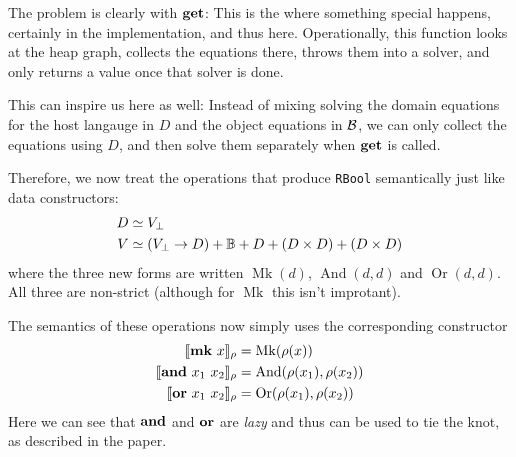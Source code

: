 \documentclass[manuscript,screen,acmsmall,nonacm]{acmart}
\begin{document}
The problem is clearly with $\mathbf{get}$: This is the where something special happens, certainly in the implementation, and thus here. Operationally, this function looks at the heap graph, collects the equations there, throws them into a solver, and only returns a value once that solver is done.

This can inspire us here as well: Instead of mixing solving the domain equations for the host langauge in $D$  and the object equations in $\mathcal B$, we can only collect the equations using $D$, and then solve them separately when $\mathbf{get}$ is called.

\newcommand{\dMk}{\operatorname{Mk}}
\newcommand{\dAnd}{\operatorname{And}}
\newcommand{\dOr}{\operatorname{Or}}

Therefore, we now treat the operations that produce \texttt{RBool} semantically just like data constructors:
\begin{align*}
D &\simeq V_\bot \\
V &\simeq (V_\bot \to D) + \mathbb B + D + (D \times D) + (D \times D)
\end{align*}
where the three new forms are written $\dMk(d)$, $\dAnd(d,d)$ and $\dOr(d,d)$. All three are non-strict (although for $\dMk$ this isn't improtant).

The semantics of these operations now simply uses the corresponding constructor
\begin{align*}
\D{\sMk~x}_\rho &= \dMk(\rho(x)) \\
\D{\sAnd~x_1~x_2}_\rho &= \dAnd(\rho(x_1), \rho(x_2)) \\
\D{\sOr~x_1~x_2}_\rho &= \dOr(\rho(x_1), \rho(x_2))
\end{align*}
Here we can see that $\mathbf{and}$ and $\mathbf{or}$ are \emph{lazy} and thus can be used to tie the knot, as described in the paper.


\newcommand{\dsolve}{\operatorname{\textit{solve}}}
\end{document}
